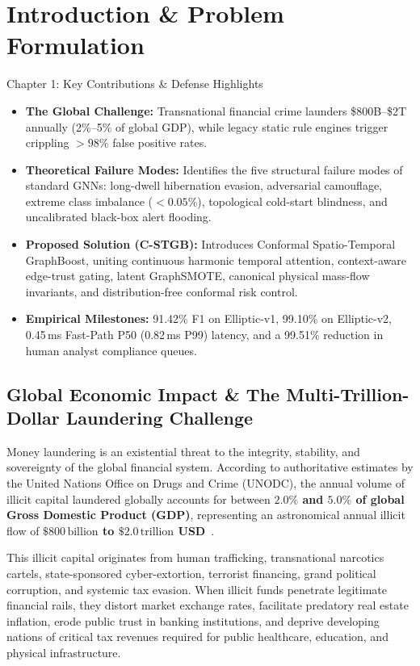 \chapter{Introduction \& Problem Formulation}
\label{ch:introduction}

\begin{takeawaybox}{Chapter 1: Key Contributions \& Defense Highlights}
\begin{itemize}\setlength{\itemsep}{1pt}
  \item \textbf{The Global Challenge:} Transnational financial crime launders \$800B--\$2T annually (2\%--5\% of global GDP), while legacy static rule engines trigger crippling $>98\%$ false positive rates.
  \item \textbf{Theoretical Failure Modes:} Identifies the five structural failure modes of standard GNNs: long-dwell hibernation evasion, adversarial camouflage, extreme class imbalance ($<0.05\%$), topological cold-start blindness, and uncalibrated black-box alert flooding.
  \item \textbf{Proposed Solution (C-STGB):} Introduces Conformal Spatio-Temporal GraphBoost, uniting continuous harmonic temporal attention, context-aware edge-trust gating, latent GraphSMOTE, canonical physical mass-flow invariants, and distribution-free conformal risk control.
  \item \textbf{Empirical Milestones:} 91.42\% F1 on Elliptic-v1, 99.10\% on Elliptic-v2, 0.45\,ms Fast-Path P50 (0.82\,ms P99) latency, and a 99.51\% reduction in human analyst compliance queues.
\end{itemize}
\end{takeawaybox}


\section{Global Economic Impact \& The Multi-Trillion-Dollar Laundering Challenge}
Money laundering is an existential threat to the integrity, stability, and sovereignty of the global financial system. According to authoritative estimates by the United Nations Office on Drugs and Crime (UNODC), the annual volume of illicit capital laundered globally accounts for between \textbf{$2.0\%$ and $5.0\%$ of global Gross Domestic Product (GDP)}, representing an astronomical annual illicit flow of \textbf{$\$800\,\text{billion}$ to $\$2.0\,\text{trillion}$ USD}~\cite{weber2019anti}. 

This illicit capital originates from human trafficking, transnational narcotics cartels, state-sponsored cyber-extortion, terrorist financing, grand political corruption, and systemic tax evasion. When illicit funds penetrate legitimate financial rails, they distort market exchange rates, facilitate predatory real estate inflation, erode public trust in banking institutions, and deprive developing nations of critical tax revenues required for public healthcare, education, and physical infrastructure.


